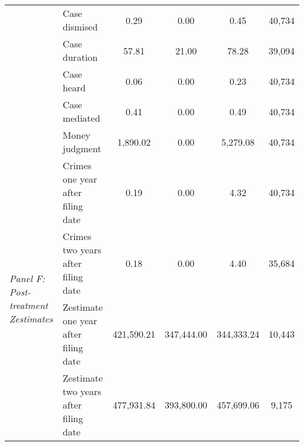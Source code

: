\begin{tabular}{llcccc}
 & Case dismised & 0.29 & 0.00 & 0.45 & 40,734 \\
 & Case duration & 57.81 & 21.00 & 78.28 & 39,094 \\
 & Case heard & 0.06 & 0.00 & 0.23 & 40,734 \\
 & Case mediated & 0.41 & 0.00 & 0.49 & 40,734 \\
 & Money judgment & 1,890.02 & 0.00 & 5,279.08 & 40,734 \\
\cline{1-6}
\multirow[c]{4}{4cm}{\textit{Panel F: Post-treatment Zestimates}} & Crimes one year after filing date & 0.19 & 0.00 & 4.32 & 40,734 \\
 & Crimes two years after filing date & 0.18 & 0.00 & 4.40 & 35,684 \\
 & Zestimate one year after filing date & 421,590.21 & 347,444.00 & 344,333.24 & 10,443 \\
 & Zestimate two years after filing date & 477,931.84 & 393,800.00 & 457,699.06 & 9,175 \\
\cline{1-6}
\bottomrule
\end{tabular}
